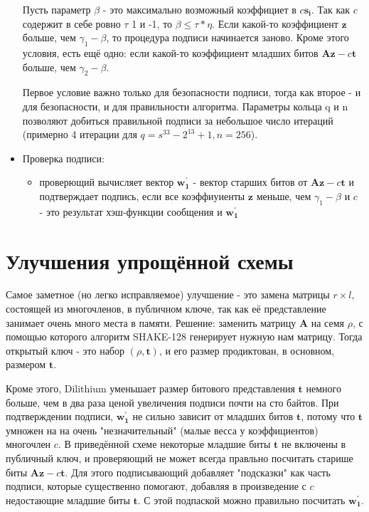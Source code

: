 \documentclass{article}
\begin{document}
\begin{itemize}
	Пусть параметр $\beta$ - это максимально возможный коэффициет в $c\mathbf{s_{i}}$. Так как $c$ содержит в себе ровно $\tau$ 1 и -1, то $\beta \leq \tau * \eta$. Если какой-то коэффициент $\mathbf{z}$ больше, чем $\gamma_{1} - \beta$, то процедура подписи начинается заново. Кроме этого условия, есть ещё одно: если какой-то коэффициент младших битов $\mathbf{A}\mathbf{z} - c\mathbf{t}$ больше, чем $\gamma_{2} - \beta$.
	
	Первое условие важно только для безопасности подписи, тогда как второе - и для безопасности, и для правильности алгоритма. Параметры кольца q и n позволяют добиться правильной подписи за небольшое число итераций (примерно 4 итерации для $q = s^33 - 2^13 +1, n = 256$).
	\item Проверка подписи:
		\begin{itemize}
			\item проверющий вычисляет вектор $\mathbf{w_{1}^{'}}$ - вектор старших битов от $\mathbf{A}\mathbf{z}-c\mathbf{t}$ и подтверждает подпись, если все коэффиуиенты $\mathbf{z}$ меньше, чем $\gamma_{1} - \beta$ и $c$ - это результат хэш-функции сообщения и $\mathbf{w_{1}^{'}}$
		\end{itemize}
	\end{itemize}
	
	\section{
			Улучшения упрощённой схемы
	}
	Самое заметное (но легко исправляемое) улучшение - это замена матрицы $r \times l$, состоящей из многочленов, в публичном ключе, так как её представление занимает очень много места в памяти. Решение: заменить матрицу $\mathbf{A}$ на семя $\rho$, с помощью которого алгоритм SHAKE-128 генерирует нужную нам матрицу. Тогда открытый ключ - это набор $(\rho,\mathbf{t})$, и его размер продиктован, в основном, размером $\mathbf{t}$. 
	
	Кроме этого, Dilithium уменьшает размер битового представления $\mathbf{t}$ немного больше, чем в два раза ценой увеличения подписи почти на сто байтов. При подтверждении подписи, $\mathbf{w_{1}^{'}}$ не сильно зависит от младших битов $\mathbf{t}$, потому что $\mathbf{t}$ умножен на на очень "незначительный" (малые весса у коэффициентов) многочлен $c$. В приведённой схеме некоторые младшие биты $\mathbf{t}$ не включены в публичный ключ, и проверяющий не может всегда правльно посчитать старише биты $\mathbf{A}\mathbf{z}-c\mathbf{t}$. Для этого подписывающий добавляет "подсказки" как часть подписи, которые существенно помогают, добавляя в произведение с $c$ недостающие младшие биты $\mathbf{t}$. С этой подпаской можно правильно посчитать $\mathbf{w_{1}^{'}}$.
	
\end{document}
